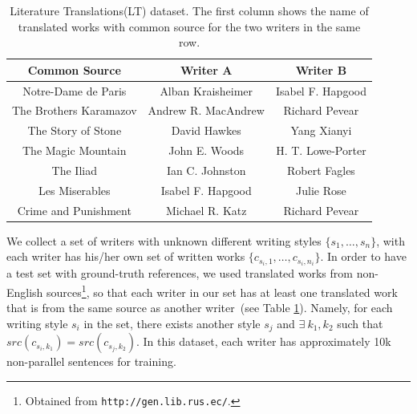 \begin{table}[t]\scriptsize
	\centering
	\begin{tabular}{c|cc}
		\hline
		\textbf{Common Source} & \textbf{Writer A} & \textbf{Writer B} \\
		\hline
		Notre-Dame de Paris & Alban Kraisheimer & Isabel F. Hapgood \\
		The Brothers Karamazov & Andrew R. MacAndrew & Richard Pevear \\
		The Story of Stone & David Hawkes & Yang Xianyi \\
		The Magic Mountain & John E. Woods & H. T. Lowe-Porter \\
		The Iliad & Ian C. Johnston & Robert Fagles \\
		Les Miserables & Isabel F. Hapgood & Julie Rose \\
		Crime and Punishment & Michael R. Katz & Richard Pevear \\
		\hline
	\end{tabular}
	\caption{Literature Translations(LT) dataset. The first column shows the name of translated works with common source for the two writers in the same row.}\label{tb:translations}
\end{table}
We collect a set of writers with unknown different writing styles $\{s_1, \ldots, s_n\}$, with each writer has his/her own set of written works $\{c_{s_i, 1}, \ldots, c_{s_i, n_i} \}$. In order to have a test set with ground-truth references, we used translated works from non-English sources\footnote{Obtained from \texttt{http://gen.lib.rus.ec/}.}, so that each writer in our set has at least one translated work that is from the same source as another writer~(see Table \ref{tb:translations}). Namely, for each writing style $s_i$ in the set, there exists another style $s_j$ and $\exists\ k_1, k_2$ such that $src(c_{s_i, k_1}) = src(c_{s_j, k_2})$. In this dataset, each writer has approximately 10k non-parallel sentences for training.


